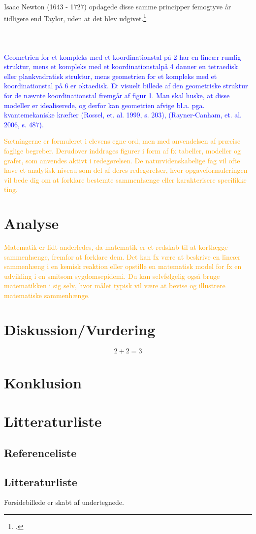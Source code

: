 \documentclass[12pt, a4paper]{article}
\begin{document}
Isaac Newton (1643 - 1727) opdagede disse samme principper femogtyve år tidligere end Taylor, uden at det blev udgivet.\footcite{roy_2021}\\
\\
\\
\\
\textcolor{blue}{Geometrien for et kompleks med et koordinationstal på 2 har en lineær rumlig struktur, mens et kompleks med et koordinationstalpå 4 danner en tetraedisk eller plankvadratisk struktur, mens geometrien for et kompleks med et koordinationstal på 6 er oktaedisk. Et visuelt billede af den geometriske struktur for de nævnte koordinationstal fremgår af figur 1. Man skal huske, at disse modeller er idealiserede, og derfor kan geometrien afvige bl.a. pga. kvantemekaniske kræfter (Rossel, et. al. 1999, s. 203), (Rayner-Canham, et. al. 2006, s. 487).}

\textcolor{orange}{Sætningerne er formuleret i elevens egne ord, men med anvendelsen af præcise faglige begreber. Derudover inddrages figurer i form af fx tabeller, modeller og grafer, som anvendes aktivt i redegørelsen.
    De naturvidenskabelige fag vil ofte have et analytisk niveau som del af deres redegørelser, hvor opgaveformuleringen vil bede dig om at forklare bestemte sammenhænge eller karakterisere specifikke ting.}
\section{Analyse} %
\textcolor{orange}{Matematik er lidt anderledes, da matematik er et redskab til at kortlægge sammenhænge, fremfor at forklare dem. Det kan fx være at beskrive en lineær sammenhæng i en kemisk reaktion eller opstille en matematisk model for fx en udvikling i en smitsom sygdomsepidemi.  Du kan selvfølgelig også bruge matematikken i sig selv, hvor målet typisk vil være at bevise og illustrere matematiske sammenhænge.}
\section{Diskussion/Vurdering} %
\begin{equation}
    2+2=3
\end{equation}
\section{Konklusion} %

\section{Litteraturliste}
\subsection{Referenceliste}
\printbibliography
\subsection{Litteraturliste}
Forsidebillede er skabt af undertegnede.
\end{document}
